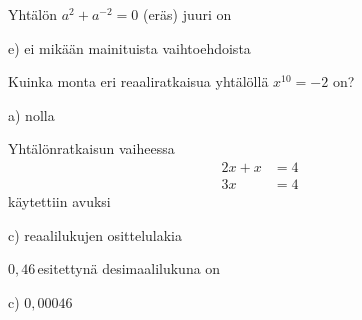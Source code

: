 \begin{tehtava} %
Yhtälön $a^2+a^{-2}=0$ (eräs) juuri on
	\begin{vastaus}
e) ei mikään mainituista vaihtoehdoista
	\end{vastaus}
\end{tehtava}

\begin{tehtava}
Kuinka monta eri reaaliratkaisua yhtälöllä $x^{10}=-2$ on?
	\begin{vastaus}
a) nolla
	\end{vastaus}
\end{tehtava}

\begin{tehtava}
Yhtälönratkaisun vaiheessa
\begin{align*}
2x+x&=4 \\
3x&=4
\end{align*}
käytettiin avuksi
	\begin{vastaus}
	c) reaalilukujen osittelulakia
	\end{vastaus}
\end{tehtava}

%
%	
%
%
%	
%
%
%	

\begin{tehtava}
$0,46$\,\permil esitettynä desimaalilukuna on
	\begin{vastaus}
	c) $0,00046$
	\end{vastaus}
\end{tehtava}


